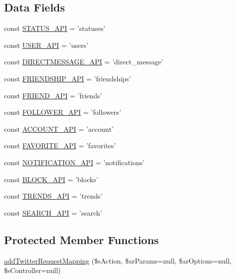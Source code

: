 \subsection*{Data Fields}
\begin{DoxyCompactItemize}
\item 
const \hyperlink{classCPSTwitterApi_a19f41a351a36bfa05c541b86e9f84a46}{STATUS\_\-API} = 'statuses'
\item 
const \hyperlink{classCPSTwitterApi_a7186266c619bf7c259df620a27a6be61}{USER\_\-API} = 'users'
\item 
const \hyperlink{classCPSTwitterApi_a7f6433ea3fadbcaed427de7f30fa5aa7}{DIRECTMESSAGE\_\-API} = 'direct\_\-message'
\item 
const \hyperlink{classCPSTwitterApi_a8179b4b95b3d7982e1cf6d713f119651}{FRIENDSHIP\_\-API} = 'friendships'
\item 
const \hyperlink{classCPSTwitterApi_a3fc010ed21ff41fb78f8b0bb606faddb}{FRIEND\_\-API} = 'friends'
\item 
const \hyperlink{classCPSTwitterApi_a4183cb69bce31e4741021ea7a3e9c326}{FOLLOWER\_\-API} = 'followers'
\item 
const \hyperlink{classCPSTwitterApi_a57a7ce6c04940622a290e914976de849}{ACCOUNT\_\-API} = 'account'
\item 
const \hyperlink{classCPSTwitterApi_abcf060692f260345e886ed3d78fe56df}{FAVORITE\_\-API} = 'favorites'
\item 
const \hyperlink{classCPSTwitterApi_a22f1a8ed1263d6338c4e3a310e4f41d2}{NOTIFICATION\_\-API} = 'notifications'
\item 
const \hyperlink{classCPSTwitterApi_ab4c32fba74b8441eb0d1497398718f80}{BLOCK\_\-API} = 'blocks'
\item 
const \hyperlink{classCPSTwitterApi_ad257a5f5d08047d89a236c8cbec1a449}{TRENDS\_\-API} = 'trends'
\item 
const \hyperlink{classCPSTwitterApi_a9e8d909f187a5d06bebda16dd0dc3dea}{SEARCH\_\-API} = 'search'
\end{DoxyCompactItemize}
\subsection*{Protected Member Functions}
\begin{DoxyCompactItemize}
\item 
\hyperlink{classCPSTwitterApi_a5caa7d4946f952e213985b0dbe8e9639}{addTwitterRequestMapping} (\$sAction, \$arParams=null, \$arOptions=null, \$sController=null)
\end{DoxyCompactItemize}


